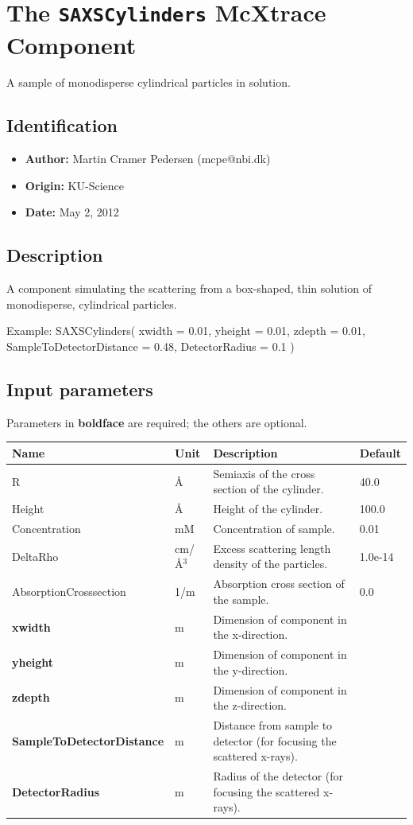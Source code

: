 \section{The \texttt{SAXSCylinders} McXtrace Component}
A sample of monodisperse cylindrical particles in solution.

\subsection*{Identification}
\begin{itemize}
  \item \textbf{Author:} Martin Cramer Pedersen (mcpe@nbi.dk)
  \item \textbf{Origin:} KU-Science
  \item \textbf{Date:} May 2, 2012
\end{itemize}

\subsection*{Description}
A component simulating the scattering from a box-shaped, thin solution of monodisperse, cylindrical particles.

Example: SAXSCylinders( xwidth = 0.01, yheight = 0.01, zdepth = 0.01, SampleToDetectorDistance = 0.48, DetectorRadius = 0.1 )

\subsection*{Input parameters}
Parameters in \textbf{boldface} are required; the others are optional.

\begin{longtable}{p{}p{}p{}p{}}
\toprule
\textbf{Name} & \textbf{Unit} & \textbf{Description} & \textbf{Default} \\
\midrule
\endhead
R & \AA{} & Semiaxis of the cross section of the cylinder. & 40.0 \\
Height & \AA{} & Height of the cylinder. & 100.0 \\
Concentration & mM & Concentration of sample. & 0.01 \\
DeltaRho & cm/\AA{}$^{3}$ & Excess scattering length density of the particles. & 1.0e-14 \\
AbsorptionCrosssection & 1/m & Absorption cross section of the sample. & 0.0 \\
\textbf{xwidth} & m & Dimension of component in the x-direction. &  \\
\textbf{yheight} & m & Dimension of component in the y-direction. &  \\
\textbf{zdepth} & m & Dimension of component in the z-direction. &  \\
\textbf{SampleToDetectorDistance} & m & Distance from sample to detector (for focusing the scattered x-rays). &  \\
\textbf{DetectorRadius} & m & Radius of the detector (for focusing the scattered x-rays). &  \\
\bottomrule
\end{longtable}

